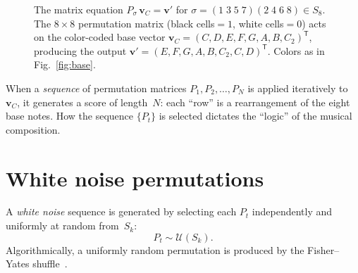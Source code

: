 \documentclass[
  twocolumn,
  aps,
  pra,
  showkeys,
  amsmath,amssymb,
  longbibliography
]{revtex4-2}
\begin{document}
\begin{figure}[t]
\caption{The matrix equation
$P_\sigma\,\mathbf{v}_C = \mathbf{v}'$ for
$\sigma=(1\;3\;5\;7)(2\;4\;6\;8)\in S_8$.
The $8\times 8$ permutation matrix
(black cells${}\!=\!1$, white cells${}\!=\!0$) acts on the
color-coded base vector
$\mathbf{v}_C=(C,D,E,F,G,A,B,C_2)^{\mathsf T}$,
producing the output
$\mathbf{v}'=(E,F,G,A,B,C_2,C,D)^{\mathsf T}$.
Colors as in Fig.~\ref{fig:base}.}
\label{fig:exampleperm}
\end{figure}

When a \emph{sequence} of permutation matrices
$P_1,P_2,\ldots,P_N$ is applied iteratively to
$\mathbf{v}_C$, it generates a score of length~$N$: each
``row'' is a rearrangement of the eight base notes.
How the sequence $\{P_t\}$ is selected dictates the
``logic'' of the musical composition.

\section{White noise permutations}
\label{sec:white}

A \emph{white noise} sequence is generated by selecting each
$P_t$ independently and uniformly at random from~$S_k$:
\begin{equation}
P_t \sim \mathcal{U}(S_k).
\label{eq:white}
\end{equation}
Algorithmically, a uniformly random permutation is produced by
the Fisher--Yates shuffle~\cite{knuth-97}.
\end{document}
